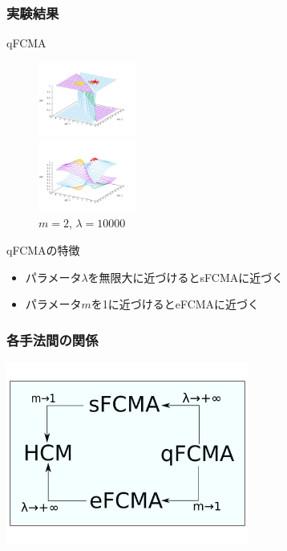 \documentclass[13pt,dvipdfmx]{beamer}
\begin{document}
\begin{frame}\frametitle{実験結果}
  \begin{block}{qFCMA}
    \begin{figure}[htbp]
      \begin{minipage}{0.4\hsize}
        \begin{center}
          \includegraphics[width=32mm]{qFCMA-Em11-Lambda10.png}
        \end{center}
        \captionsetup{labelformat=empty,labelsep=none}
        \caption{$m=1.01$\;, \;$\lambda=10$}
        \label{fig:one}
      \end{minipage}
      \begin{minipage}{0.4\hsize}
        \begin{center}
          \includegraphics[width=32mm]{qFCMA-Em2-Lambda10000.png}
        \end{center}
        \captionsetup{labelformat=empty,labelsep=none}
        \caption{$m=2$\;, \;$\lambda=10000$}
        \label{fig:two}
      \end{minipage}
    \end{figure}
  \end{block}
  \begin{block}{qFCMAの特徴}
    \begin{itemize}
      \item パラメータ$\lambda$を無限大に近づけるとsFCMAに近づく
      \item パラメータ$m$を1に近づけるとeFCMAに近づく
    \end{itemize}
  \end{block}
\end{frame}

\begin{frame}\frametitle{各手法間の関係}
  \begin{center}
    \includegraphics[height=60mm]{method.png}
  \end{center}
\end{frame}
\end{document}
